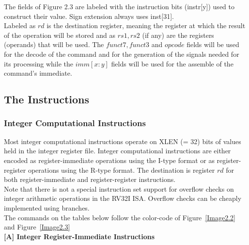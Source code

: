 	The fields of Figure 2.3 are labeled with the instruction bits (instr[y]) used to construct their value. Sign extension always uses inst[31]. \\
	
	Labeled as $rd$ is the destination register, meaning the register at which the result of the operation will be stored and as $rs1,rs2$ (if any) are the registers (operands) that will be used. The $funct7,funct3$ and $opcode$ fields will be used for the decode of the command and for the generation of the signals needed for its processing while the $imm[x:y]$ fields will be used for the assemble of the command's immediate.	
	\newpage
	\subsection{The Instructions}
	\label{subsec:ActualInstructions}
	\subsubsection{Integer Computational Instructions}
	\label{subsubsec:IntegerInstr}
	Most integer computational instructions operate on XLEN (= 32) bits of values held in the integer register file. Integer computational instructions are either encoded as register-immediate operations using the I-type format or as register-register operations using the R-type format. The destination is register $rd$ for both register-immediate and register-register instructions. \\
	Note that there is not a special instruction set support for overflow checks on integer arithmetic operations in the RV32I ISA. Overflow checks can be cheaply implemented using branches. \\
	The commands on the tables below follow the color-code of  Figure~\ref{Image2.2} and Figure~\ref{Image2.3} \\
	\vspace{4mm}
	\textbf{ {\footnotesize[A] Integer Register-Immediate Instructions }} \\
	
